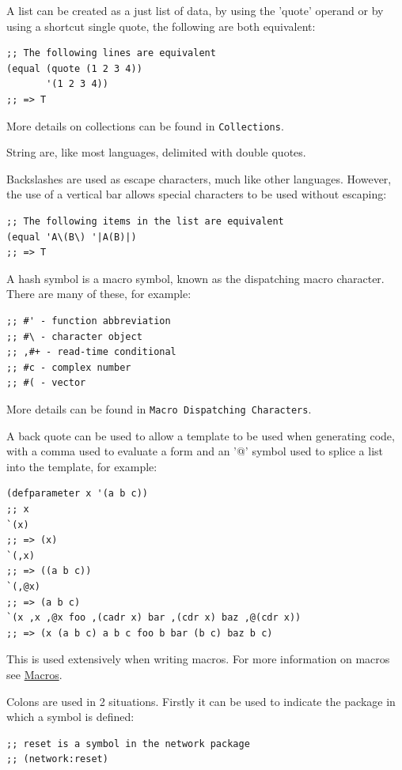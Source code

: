 \documentclass[11pt]{article}
\begin{document}
A list can be created as a just list of data, by using the 'quote'
operand or by using a shortcut single quote, the following are both
equivalent:

\begin{verbatim}
;; The following lines are equivalent
(equal (quote (1 2 3 4))
       '(1 2 3 4))
;; => T
\end{verbatim}

More details on collections can be found in \texttt{Collections}.

String are, like most languages, delimited with double quotes.

Backslashes are used as escape characters, much like other
languages. However, the use of a vertical bar allows special
characters to be used without escaping:

\begin{verbatim}
;; The following items in the list are equivalent
(equal 'A\(B\) '|A(B)|)
;; => T
\end{verbatim}

A hash symbol is a macro symbol, known as the dispatching macro
character. There are many of these, for example:

\begin{verbatim}
;; #' - function abbreviation
;; #\ - character object
;; ,#+ - read-time conditional
;; #c - complex number
;; #( - vector
\end{verbatim}

More details can be found in \texttt{Macro Dispatching Characters}.

A back quote can be used to allow a template to be used when
generating code, with a comma used to evaluate a form and an '@'
symbol used to splice a list into the template, for example:

\begin{verbatim}
(defparameter x '(a b c))
;; x
`(x)
;; => (x)
`(,x)
;; => ((a b c))
`(,@x)
;; => (a b c)
`(x ,x ,@x foo ,(cadr x) bar ,(cdr x) baz ,@(cdr x))
;; => (x (a b c) a b c foo b bar (b c) baz b c)
\end{verbatim}

This is used extensively when writing macros. For more information
on macros see \hyperref[sec-15]{Macros}.

Colons are used in 2 situations. Firstly it can be used to indicate
the package in which a symbol is defined:

\begin{verbatim}
;; reset is a symbol in the network package
;; (network:reset)
\end{verbatim}
\end{document}
